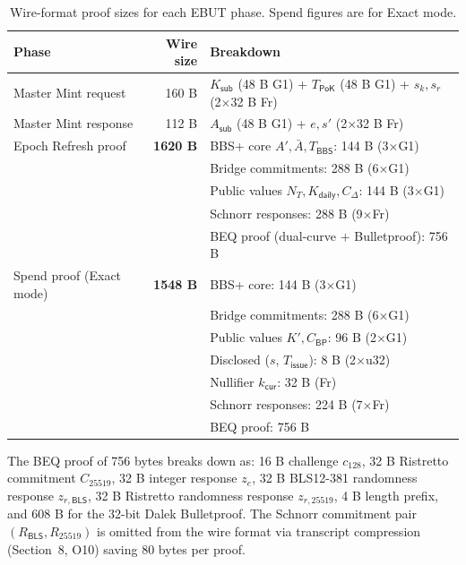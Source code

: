 \documentclass[11pt]{article}
\theoremstyle{definitionstyle}
\theoremstyle{plain}
\begin{document}
\begin{table}[htbp]
\centering
\small
\begin{tabular}{|l|r|l|}
\hline
\textbf{Phase} & \textbf{Wire size} & \textbf{Breakdown} \\
\hline
Master Mint request  & 160 B & $K_{\mathsf{sub}}$ (48 B G1) + $T_{\mathsf{PoK}}$ (48 B G1) + $s_k, s_r$ (2$\times$32 B Fr) \\
Master Mint response & 112 B & $A_{\mathsf{sub}}$ (48 B G1) + $e, s'$ (2$\times$32 B Fr) \\
\hline
Epoch Refresh proof  & \textbf{1620 B} & BBS+ core $A', \bar{A}, T_{\mathsf{BBS}}$: 144 B (3$\times$G1) \\
                     &       & Bridge commitments: 288 B (6$\times$G1) \\
                     &       & Public values $N_T, K_{\mathsf{daily}}, C_\Delta$: 144 B (3$\times$G1) \\
                     &       & Schnorr responses: 288 B (9$\times$Fr) \\
                     &       & BEQ proof (dual-curve $+$ Bulletproof): 756 B \\
\hline
Spend proof (Exact mode) & \textbf{1548 B} & BBS+ core: 144 B (3$\times$G1) \\
                     &       & Bridge commitments: 288 B (6$\times$G1) \\
                     &       & Public values $K', C_{\mathsf{BP}}$: 96 B (2$\times$G1) \\
                     &       & Disclosed ($s$, $T_{\mathsf{issue}}$): 8 B (2$\times$u32) \\
                     &       & Nullifier $k_{\mathsf{cur}}$: 32 B (Fr) \\
                     &       & Schnorr responses: 224 B (7$\times$Fr) \\
                     &       & BEQ proof: 756 B \\
\hline
\end{tabular}
\caption{Wire-format proof sizes for each EBUT phase.  Spend figures are for Exact mode.}
\label{tab:sizes}
\end{table}

The BEQ proof of 756 bytes breaks down as: 16 B challenge $c_{128}$,
32 B Ristretto commitment $C_{25519}$, 32 B integer response $z_e$,
32 B BLS12-381 randomness response $z_{r,\mathsf{BLS}}$, 32 B Ristretto
randomness response $z_{r,25519}$, 4 B length prefix, and 608 B for the
32-bit Dalek Bulletproof.  The Schnorr commitment pair $(R_{\mathsf{BLS}},
R_{25519})$ is omitted from the wire format via transcript compression
(Section~8, O10) saving 80 bytes per proof.
\end{document}
